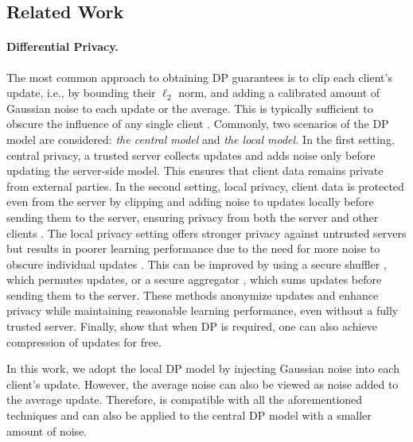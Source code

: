 \documentclass[a4paper,11pt]{article}
\begin{document}
\subsection{Related Work}

\paragraph{Differential Privacy.} The most common approach to obtaining DP guarantees is to clip each client's update, i.e., by bounding their $\ell_2$ norm, and adding a calibrated amount of Gaussian noise to each update or the average. This is typically sufficient to obscure the influence of any single client \citep{mcmahan2017learning}. Commonly, two scenarios of the DP model are considered: \textit{the central model} and \textit{the local model.} In the first setting, central privacy, a trusted server collects updates and adds noise only before updating the server-side model. This ensures that client data remains private from external parties. In the second setting, local privacy, client data is protected even from the server by clipping and adding noise to updates locally before sending them to the server, ensuring privacy from both the server and other clients \citep{kasiviswanathan2011can, allouah2024privacy}. The local privacy setting offers stronger privacy against untrusted servers but results in poorer learning performance due to the need for more noise to obscure individual updates \citep{chan2012optimal, duchi2018minimax}. This can be improved by using a secure shuffler \citep{erlingsson2019amplification, balle2019privacy}, which permutes updates, or a secure aggregator \citep{bonawitz2017practical}, which sums updates before sending them to the server. These methods anonymize updates and enhance privacy while maintaining reasonable learning performance, even without a fully trusted server. Finally, \citep{chaudhuri2022privacy, hegazy2024compression} show that when DP is required, one can also achieve compression of updates for free.

In this work, we adopt the local DP model by injecting Gaussian noise into each client's update. However, the average noise can also be viewed as noise added to the average update. Therefore,  is compatible with all the aforementioned techniques and can also be applied to the central DP model with a smaller amount of noise.
\end{document}
